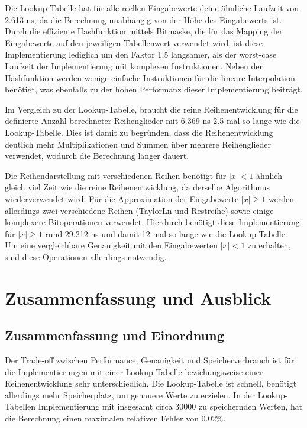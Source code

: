 \documentclass[course=erap] {aspdoc}
\begin{document}
     Die Lookup-Tabelle hat für alle reellen Eingabewerte deine ähnliche Laufzeit von 2.613 ns, da die Berechnung unabhängig von der Höhe des Eingabewerts ist.
    Durch die effiziente Hashfunktion mittels Bitmaske, die für das Mapping der Eingabewerte auf den jeweiligen Tabellenwert verwendet wird, ist diese Implementierung lediglich um den Faktor 1,5 langsamer, als der worst-case Laufzeit der Implementierung mit komplexen Instruktionen.
    Neben der Hashfunktion werden wenige einfache Instruktionen für die lineare Interpolation benötigt, was ebenfalls zu der hohen Performanz dieser Implementierung beiträgt.

     Im Vergleich zu der Lookup-Tabelle, braucht die reine Reihenentwicklung für die definierte Anzahl berechneter Reihenglieder mit 6.369 ns 2.5-mal so lange wie die Lookup-Tabelle.
    Dies ist damit zu begründen, dass die Reihenentwicklung deutlich mehr Multiplikationen und Summen über mehrere Reihenglieder verwendet, wodurch die Berechnung länger dauert.

     Die Reihendarstellung mit verschiedenen Reihen benötigt für $|x|<1$ ähnlich gleich viel Zeit wie die reine Reihenentwicklung, da derselbe Algorithmus wiederverwendet wird.
    Für die Approximation der Eingabewerte $|x|\geq1$ werden allerdings zwei verschiedene Reihen (TaylorLn und Restreihe) sowie einige komplexere Bitoperationen verwendet.
    Hierdurch benötigt diese Implementierung für $|x|\geq1$ rund 29.212 ns und damit 12-mal so lange wie die Lookup-Tabelle.
    Um eine vergleichbare Genauigkeit mit den Eingabewerten $|x|<1$ zu erhalten, sind diese Operationen allerdings notwendig.

    \section{Zusammenfassung und Ausblick}\label{sec:zusammenfassung-und-ausblick}

    \subsection{Zusammenfassung und Einordnung}\label{subsec:zusammenfassung}
    
    Der Trade-off zwischen Performance, Genauigkeit und Speicherverbrauch ist für die Implementierungen mit einer Lookup-Tabelle beziehungsweise einer Reihenentwicklung sehr unterschiedlich.
    Die Lookup-Tabelle ist schnell, benötigt allerdings mehr Speicherplatz, um genauere Werte zu erzielen.
    In der Lookup-Tabellen Implementierung mit insgesamt circa 30000 zu speichernden Werten, hat die Berechnung einen maximalen relativen Fehler von 0.02\%.
\end{document}
